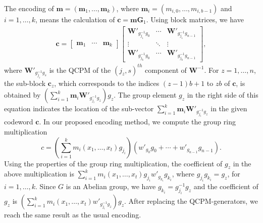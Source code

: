 \documentclass[journal,draftclsnofoot,onecolumn,12pt,twoside]{IEEEtran}
\begin{document}
\begin{IEEEproof}
The encoding of $\mathbf{m}=(\mathbf{m}_1,\ldots ,\mathbf{m}_k)$, where $\mathbf{m}_i=(m_{i,0},\ldots ,m_{i,b-1})$ and $i=1,\ldots,k$, means the calculation of $\mathbf{c}=\mathbf{m}\mathbf{G}_1$. Using block matrices, we have
\begin{eqnarray}
\mathbf{c}=\left[\begin{array}{ccc}
\mathbf{m}_1 & \cdots &\mathbf{m}_k \end{array} \right]\left[ \begin{array}{ccc}
\mathbf{W}'_{g_{j_1}^{-1}g_0} & \cdots & \mathbf{W}'_{g_{j_1}^{-1}g_{n-1}}\\
\vdots & \ddots & \vdots\\
\mathbf{W}'_{g_{j_k}^{-1}g_0} & \cdots & \mathbf{W}'_{g_{j_k}^{-1}g_{n-1}}
\end{array}
\right],
\end{eqnarray}
where $\mathbf{W}'_{g_{j_z}^{-1}g_{s}}$ is the QCPM of the $(j_z,s)^{th}$ component of $\mathbf{W}^{-1}$. For $z=1,\ldots,n$, the sub-block $\mathbf{c}_z$, which corresponds to the indices $(z-1)b+1$ to $zb$ of $\mathbf{c}$, is obtained by $\left( \sum_{i=1}^{k}\mathbf{m}_i\mathbf{W}'_{g_{j_i}^{-1}g_z} \right) g_z$. The group element $g_z$ in the right side of this equation indicates the location of the sub-vector $\sum_{i=1}^{k}\mathbf{m}_i\mathbf{W}'_{g_{j_i}^{-1}g_z}$ in the given codeword $\mathbf{c}$. In our proposed encoding method, we compute the group ring multiplication
$$c=\left(\sum_{i=1}^{k}m_i(x_1,\ldots ,x_t)g_{j_i} \right)(w'_{g_{0}}g_{0}+\cdots +w'_{g_{n-1}}g_{n-1}).$$
Using the properties of the group ring multiplication, the coefficient of $g_z$ in the above multiplication is $\sum_{i=1}^{k}m_i(x_1,\ldots ,x_t) g_{j_i} w'_{g_{k_i}}g_{k_i}$, where $ g_{j_i}g_{k_i}=g_z$, for $i=1,\ldots ,k$. Since $G$ is an Abelian group, we have $g_{k_i}=g_{j_i}^{-1}g_z$ and the coefficient of $g_z$ is $\left(\sum_{i=1}^{k}m_i(x_1,\ldots ,x_t)w'_{g_{j_i}^{-1}g_z}\right)g_{z}$.  After replacing the QCPM-generators, we reach the same result as the usual encoding.
\end{IEEEproof}
\end{document}
